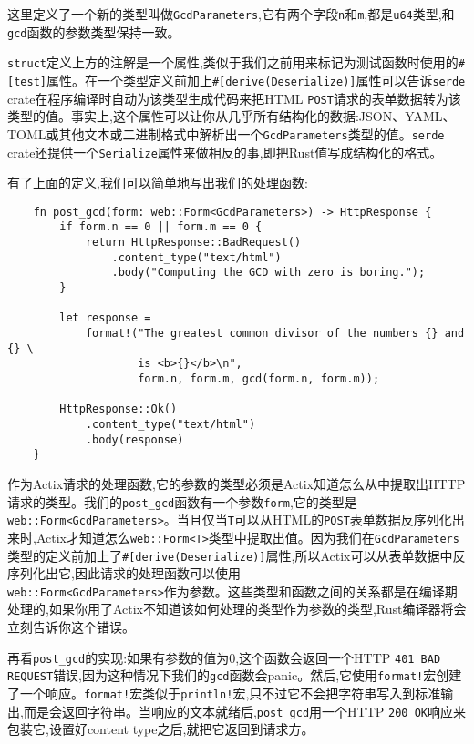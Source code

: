 这里定义了一个新的类型叫做\texttt{GcdParameters},它有两个字段\texttt{n}和\texttt{m},都是\texttt{u64}类型,和\texttt{gcd}函数的参数类型保持一致。

\texttt{struct}定义上方的注解是一个属性,类似于我们之前用来标记为测试函数时使用的\texttt{\#[test]}属性。在一个类型定义前加上\texttt{\#[derive(Deserialize)]}属性可以告诉\texttt{serde} crate在程序编译时自动为该类型生成代码来把HTML \texttt{POST}请求的表单数据转为该类型的值。事实上,这个属性可以让你从几乎所有结构化的数据:JSON、YAML、TOML或其他文本或二进制格式中解析出一个\texttt{GcdParameters}类型的值。\texttt{serde} crate还提供一个\texttt{Serialize}属性来做相反的事,即把Rust值写成结构化的格式。

有了上面的定义,我们可以简单地写出我们的处理函数:
\begin{verbatim}
    fn post_gcd(form: web::Form<GcdParameters>) -> HttpResponse {
        if form.n == 0 || form.m == 0 {
            return HttpResponse::BadRequest()
                .content_type("text/html")
                .body("Computing the GCD with zero is boring.");
        }

        let response = 
            format!("The greatest common divisor of the numbers {} and {} \
                    is <b>{}</b>\n",
                    form.n, form.m, gcd(form.n, form.m));
        
        HttpResponse::Ok()
            .content_type("text/html")
            .body(response)
    }
\end{verbatim}

作为Actix请求的处理函数,它的参数的类型必须是Actix知道怎么从中提取出HTTP请求的类型。我们的\texttt{post\_gcd}函数有一个参数\texttt{form},它的类型是\texttt{web::Form<GcdParameters>}。当且仅当\texttt{T}可以从HTML的\texttt{POST}表单数据反序列化出来时,Actix才知道怎么\texttt{web::Form<T>}类型中提取出值。因为我们在\texttt{GcdParameters}类型的定义前加上了\texttt{\#[derive(Deserialize)]}属性,所以Actix可以从表单数据中反序列化出它,因此请求的处理函数可以使用\\
\texttt{web::Form<GcdParameters>}作为参数。这些类型和函数之间的关系都是在编译期处理的,如果你用了Actix不知道该如何处理的类型作为参数的类型,Rust编译器将会立刻告诉你这个错误。

再看\texttt{post\_gcd}的实现:如果有参数的值为0,这个函数会返回一个HTTP \texttt{401 BAD REQUEST}错误,因为这种情况下我们的\texttt{gcd}函数会panic。然后,它使用\texttt{format!}宏创建了一个响应。\texttt{format!}宏类似于\texttt{println!}宏,只不过它不会把字符串写入到标准输出,而是会返回字符串。当响应的文本就绪后,\texttt{post\_gcd}用一个HTTP \texttt{200 OK}响应来包装它,设置好content type之后,就把它返回到请求方。

